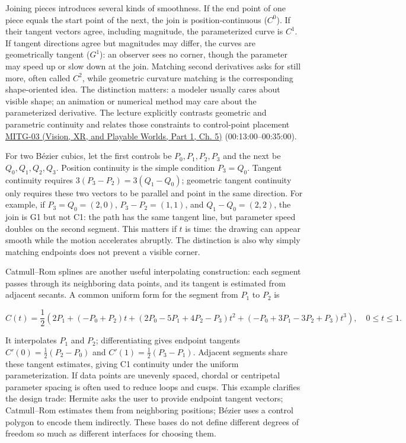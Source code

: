 Joining pieces introduces several kinds of smoothness. If the end point of one piece equals the start point of the next, the join is position-continuous (\(C^0\)). If their tangent vectors agree, including magnitude, the parameterized curve is \(C^1\). If tangent directions agree but magnitudes may differ, the curves are geometrically tangent (\(G^1\)): an observer sees no corner, though the parameter may speed up or slow down at the join. Matching second derivatives asks for still more, often called \(C^2\), while geometric curvature matching is the corresponding shape-oriented idea. The distinction matters: a modeler usually cares about visible shape; an animation or numerical method may care about the parameterized derivative. The lecture explicitly contrasts geometric and parametric continuity and relates those constraints to control-point placement \href{../07-Vision-XR-and-Playable-Worlds-P01/main.pdf\#04-visual-computing-ii-ch036-mitg-03---curves-and-surfaces}{MITG-03 (Vision, XR, and Playable Worlds, Part 1, Ch. 5)} (00:13:00--00:35:00).

For two Bézier cubics, let the first controls be \(P_0,P_1,P_2,P_3\) and the next be \(Q_0,Q_1,Q_2,Q_3\). Position continuity is the simple condition \(P_3=Q_0\). Tangent continuity requires \(3(P_3-P_2)=3(Q_1-Q_0)\); geometric tangent continuity only requires these two vectors to be parallel and point in the same direction. For example, if \(P_3=Q_0=(2,0)\), \(P_3-P_2=(1,1)\), and \(Q_1-Q_0=(2,2)\), the join is G1 but not C1: the path has the same tangent line, but parameter speed doubles on the second segment. This matters if \(t\) is time: the drawing can appear smooth while the motion accelerates abruptly. The distinction is also why simply matching endpoints does not prevent a visible corner.

Catmull--Rom splines are another useful interpolating construction: each segment passes through its neighboring data points, and its tangent is estimated from adjacent secants. A common uniform form for the segment from \(P_1\) to \(P_2\) is

\[
C(t)=\frac12\left(2P_1+(-P_0+P_2)t+(2P_0-5P_1+4P_2-P_3)t^2+(-P_0+3P_1-3P_2+P_3)t^3\right),\quad 0\le t\le1.
\]

It interpolates \(P_1\) and \(P_2\); differentiating gives endpoint tangents \(C'(0)=\frac12(P_2-P_0)\) and \(C'(1)=\frac12(P_3-P_1)\). Adjacent segments share these tangent estimates, giving C1 continuity under the uniform parameterization. If data points are unevenly spaced, chordal or centripetal parameter spacing is often used to reduce loops and cusps. This example clarifies the design trade: Hermite asks the user to provide endpoint tangent vectors; Catmull--Rom estimates them from neighboring positions; Bézier uses a control polygon to encode them indirectly. These bases do not define different degrees of freedom so much as different interfaces for choosing them.

